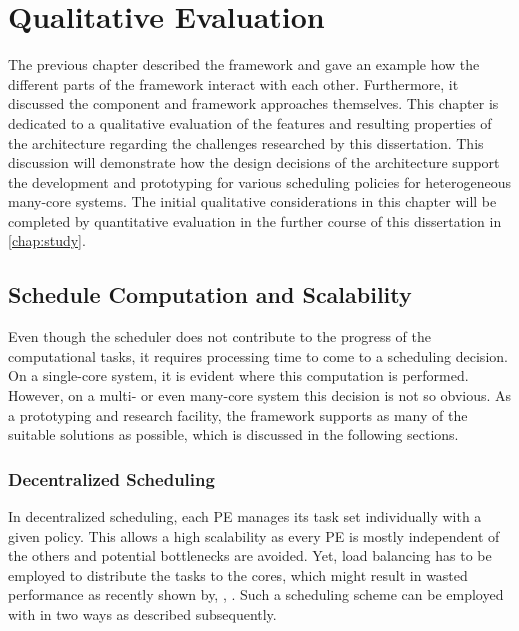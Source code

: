 \chapter{Qualitative Evaluation}%
\label{chap:prop}

The previous chapter described the \cobas{} framework and gave an example how the different parts of the framework interact with each other. Furthermore, it discussed the component and framework approaches themselves. This chapter is dedicated to a qualitative evaluation of the features and resulting properties of the \cobas{} architecture regarding the challenges researched by this dissertation. This discussion will demonstrate how the design decisions of the architecture support the development and prototyping for various scheduling policies for heterogeneous many-core systems. The initial qualitative considerations in this chapter will be completed by quantitative evaluation in the further course of this dissertation in \cref{chap:study}.

\section{Schedule Computation and Scalability}%
\label{sec:prop:computation}

Even though the scheduler does not contribute to the progress of the computational tasks, it requires processing time to come to a scheduling decision. On a single-core system, it is evident where this computation is performed. However, on a multi- or even many-core system this decision is not so obvious. As a prototyping and research facility, the \cobas{} framework supports as many of the suitable solutions as possible, which is discussed in the following sections.

\subsection{Decentralized Scheduling}%
\label{sec:prop:computation:decentralizied}

In decentralized scheduling, each \ac{PE} manages its task set individually with a given policy. This allows a high scalability as every \ac{PE} is mostly independent of the others and potential bottlenecks are avoided. Yet, load balancing has to be employed to distribute the tasks to the cores, which might result in wasted performance as recently shown by, \eg{}, \textcite{Lozi-2016-WastedCores}. Such a scheduling scheme can be employed with \cobas{} in two ways as described subsequently.

